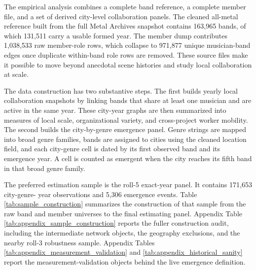 The empirical analysis combines a complete band reference, a complete member file, and a set of
derived city-level collaboration panels. The cleaned all-metal reference built from the full Metal
Archives snapshot contains 163,965 bands, of which 131,511 carry a usable formed year. The member
dump contributes 1,038,533 raw member-role rows, which collapse to 971,877 unique
musician-band edges once duplicate within-band role rows are removed. These source files make it
possible to move beyond anecdotal scene histories and study local collaboration at scale.

The data construction has two substantive steps. The first builds yearly local collaboration
snapshots by linking bands that share at least one musician and are active in the same year. These
city-year graphs are then summarized into measures of local scale, organizational variety, and
cross-project worker mobility. The second builds the city-by-genre emergence panel. Genre strings
are mapped into broad genre families, bands are assigned to cities using the cleaned location
field, and each city-genre cell is dated by its first observed band and its emergence year. A cell
is counted as emergent when the city reaches its fifth band in that broad genre family.

The preferred estimation sample is the roll-5 exact-year panel. It contains 171,653 city-genre-
year observations and 5,306 emergence events. Table \ref{tab:sample_construction} summarizes the
construction of that sample from the raw band and member universes to the final estimating panel.
Appendix Table \ref{tab:appendix_sample_construction} reports the fuller construction audit,
including the intermediate network objects, the geography exclusions, and the nearby roll-3
robustness sample. Appendix Tables \ref{tab:appendix_measurement_validation} and
\ref{tab:appendix_historical_sanity} report the measurement-validation objects behind the live
emergence definition.


